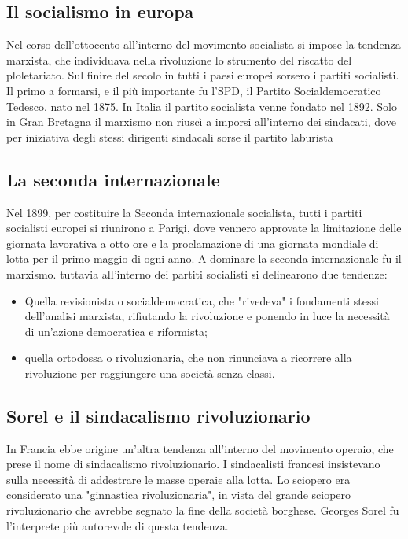 \documentclass{report}
\begin{document}
\subsection{Il socialismo in europa}
Nel corso dell'ottocento all'interno del movimento socialista si impose la tendenza marxista, che individuava nella rivoluzione lo strumento del riscatto del ploletariato. Sul finire del secolo in tutti i paesi europei sorsero i partiti socialisti. Il primo a formarsi, e il più importante fu l'SPD, il Partito Socialdemocratico Tedesco, nato nel 1875. In Italia il partito socialista venne fondato nel 1892. Solo in Gran Bretagna il marxismo non riuscì a imporsi all'interno dei sindacati, dove per iniziativa degli stessi dirigenti sindacali sorse il partito laburista

\subsection{La seconda internazionale}
Nel 1899, per costituire la Seconda internazionale socialista, tutti i partiti socialisti europei si riunirono a Parigi, dove vennero approvate la limitazione delle giornata lavorativa a otto ore e la proclamazione di una giornata mondiale di lotta per il primo maggio di ogni anno. 
A dominare la seconda internazionale fu il marxismo. tuttavia all'interno dei partiti socialisti si delinearono due tendenze:
\begin{itemize}
  \item Quella revisionista o socialdemocratica, che "rivedeva" i fondamenti stessi dell'analisi marxista, rifiutando la rivoluzione e ponendo in luce la necessità di un'azione democratica e riformista;
  \item quella ortodossa o rivoluzionaria, che non rinunciava a ricorrere alla rivoluzione per raggiungere una società senza classi.
\end{itemize}

\subsection{Sorel e il sindacalismo rivoluzionario}
In Francia ebbe origine un'altra tendenza all'interno del movimento operaio, che prese il nome di sindacalismo rivoluzionario. I sindacalisti francesi insistevano sulla necessità di addestrare le masse operaie alla lotta. Lo sciopero era considerato una "ginnastica rivoluzionaria", in vista del grande sciopero rivoluzionario che avrebbe segnato la fine della società borghese. Georges Sorel fu l'interprete più autorevole di questa tendenza.
\end{document}
